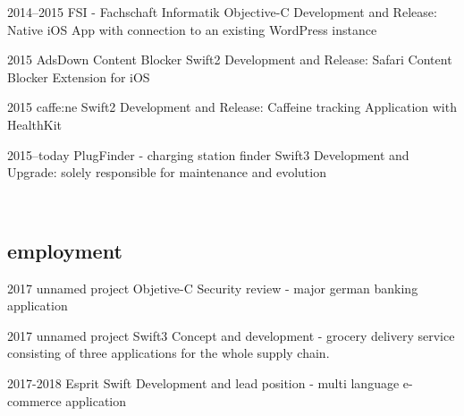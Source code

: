 \documentclass[]{friggeri-cv} %
\begin{document}
\begin{entrylist}


\entry
{2014--2015}
{FSI - Fachschaft Informatik}
{Objective-C}
{Development and Release: Native iOS App with connection to an existing WordPress instance}


\entry
{2015}
{AdsDown Content Blocker}
{Swift2}
{Development and Release: Safari Content Blocker Extension for iOS}


\entry
{2015}
{caffe:ne}
{Swift2}
{Development and Release: Caffeine tracking Application with HealthKit}


\entry
{2015--today}
{PlugFinder - charging station finder}
{Swift3}
{Development and Upgrade: solely responsible for maintenance and evolution}

\\
\end{entrylist}

\subsection{employment}

\begin{entrylist}
	
	
	\entry
	{2017}
	{unnamed project}
	{Objetive-C}
	{Security review - major german banking application}
	
	
	\entry
	{2017}
	{unnamed project}
	{Swift3}
	{Concept and development - grocery delivery service consisting of three applications for the whole supply chain.}
	
	
	\entry
	{2017-2018}
	{Esprit}
	{Swift}
	{Development and lead position - multi language e-commerce application}
	
	\\
\end{entrylist}
\end{document}
